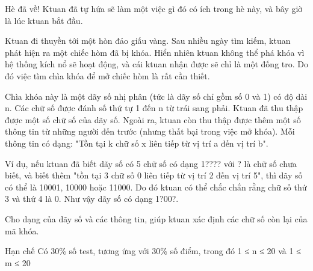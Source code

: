 Hè đã về! Ktuan đã tự hứa sẽ làm một việc gì đó có ích trong hè này, và bây giờ là lúc ktuan bắt đầu.

Ktuan đi thuyền tới một hòn đảo giấu vàng. Sau nhiều ngày tìm kiếm, ktuan phát hiện ra một chiếc hòm đã bị khóa. Hiển nhiên ktuan không thể phá khóa vì hệ thống kích nổ sẽ hoạt động, và cái ktuan nhận được sẽ chỉ là một đống tro. Do đó việc tìm chìa khóa để mở chiếc hòm là rất cần thiết.

Chìa khóa này là một dãy số nhị phân (tức là dãy số chỉ gồm số 0 và 1) có độ dài n. Các chữ số được đánh số thứ tự 1 đến n từ trái sang phải. Ktuan đã thu thập được một số chữ số của dãy số. Ngoài ra, ktuan còn thu thập được thêm một số thông tin từ những người đến trước (nhưng thất bại trong việc mở khóa). Mỗi thông tin có dạng: "Tồn tại k chữ số x liên tiếp từ vị trí a đến vị trí b".

Ví dụ, nếu ktuan đã biết dãy số có 5 chữ số có dạng 1???? với ? là chữ số chưa biết, và biết thêm "tồn tại 3 chữ số 0 liên tiếp từ vị trí 2 đến vị trí 5", thì dãy số có thể là 10001, 10000 hoặc 11000. Do đó ktuan có thể chắc chắn rằng chữ số thứ 3 và thứ 4 là 0. Như vậy dãy số có dạng 1?00?.

Cho dạng của dãy số và các thông tin, giúp ktuan xác định các chữ số còn lại của mã khóa.

Hạn chế
Có 30\% số test, tương ứng với 30\% số điểm, trong đó 1 ≤ n ≤ 20 và 1 ≤ m ≤ 20